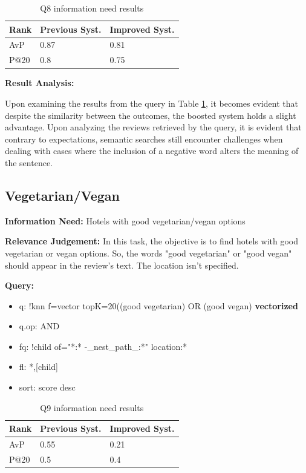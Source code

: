 \documentclass[sigconf]{acmart}
\begin{document}
\begin{table}[H]
\caption{Q8 information need results}
\label{tab:q8}
\begin{tabular}{lll}
\toprule
Rank & Previous Syst. & Improved Syst.\\
\midrule
AvP & 0.87 & 0.81  \\
P@20 & 0.8 & 0.75 \\
\bottomrule
\end{tabular}
\end{table}

\textbf{Result Analysis:} 

Upon examining the results from the query in Table \ref{tab:q8}, it becomes evident that despite the similarity between the outcomes, the boosted system holds a slight advantage.
Upon analyzing the reviews retrieved by the query, it is evident that contrary to expectations, semantic searches still encounter challenges when dealing with cases where the inclusion of a negative word alters the meaning of the sentence.

\subsection{Vegetarian/Vegan}

\textbf{Information Need:} Hotels with good vegetarian/vegan options

\textbf{Relevance Judgement:} In this task, the objective is to find hotels with good vegetarian or vegan options. So, the words "good vegetarian" or "good vegan" should appear in the review's text. The location isn't specified.

\textbf{Query:}

\begin{itemize}
    \item q: {!knn f=vector topK=20}((good vegetarian) OR (good vegan) \textbf{vectorized}
    \item q.op: AND
    \item fq: {!child of="*:* -\_nest\_path\_:*"} location:*
    \item fl: *,[child]
    \item sort: score desc
\end{itemize}

\begin{table}[H]
\caption{Q9 information need results}
\label{tab:q9}
\begin{tabular}{lll}
\toprule
Rank & Previous Syst. & Improved Syst.\\
\midrule
AvP & 0.55 & 0.21  \\
P@20 & 0.5 & 0.4 \\
\bottomrule
\end{tabular}
\end{table}
\end{document}
